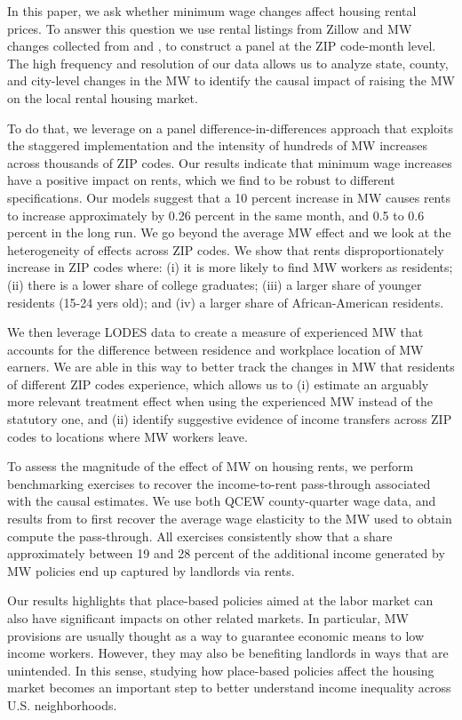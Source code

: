 
In this paper, we ask whether minimum wage changes affect housing rental prices. To answer this 
question we use rental listings from Zillow and MW changes collected from 
\textcite{VaghulZipperer2016} and \textcite{BerkeleyLaborCenter}, to construct a panel 
at the ZIP code-month level. The high frequency and resolution of our data allows us to analyze state, 
county, and city-level changes in the MW to identify the causal impact of raising the MW on the 
local rental housing market. 

To do that, we leverage on a panel difference-in-differences approach that 
exploits the staggered implementation and the intensity of hundreds of MW increases 
across thousands of ZIP codes. Our results indicate that minimum wage increases have a
positive impact on rents, which we find to be robust to different specifications. Our models
suggest that a 10 percent increase in MW causes rents to increase approximately by 
0.26 percent in the same month, and 0.5 to 0.6 percent in the long run. We go beyond the average 
MW effect and we look at the heterogeneity of effects across ZIP codes. 
We show that rents disproportionately increase in ZIP codes where: (i) it is more likely to find 
MW workers as residents; (ii) there is a lower share of college graduates;  (iii) a larger share 
of younger residents (15-24 yers old);  and (iv) a larger share of African-American residents. 

We then leverage LODES data to create a measure of experienced MW that accounts for the difference 
between residence and workplace location of MW earners. We are able in this way to better track the 
changes in MW that residents of different ZIP codes experience, which allows us to (i) estimate an 
arguably more relevant treatment effect when using the experienced MW instead of the statutory one,
and (ii) identify suggestive evidence of income transfers across ZIP codes to locations where MW
workers leave.

To assess the magnitude of the effect of MW on housing rents, we perform benchmarking exercises to 
recover the income-to-rent pass-through associated with the causal estimates. We use both QCEW 
county-quarter wage data, and results from \textcite{CegnizEtAl2019} to first recover the average 
wage elasticity to the MW used to obtain compute the pass-through. All exercises consistently show 
that a share approximately between 19 and 28 percent of the additional income generated by MW 
policies end up captured by landlords via rents.

Our results highlights that place-based policies aimed at the labor market can also have 
significant impacts on other related markets. In particular, MW provisions are usually thought as a 
way to guarantee economic means to low income workers. However, they may also be benefiting 
landlords in ways that are unintended. In this sense, studying how place-based policies affect the 
housing market becomes an important step to better understand income inequality across U.S. 
neighborhoods.
